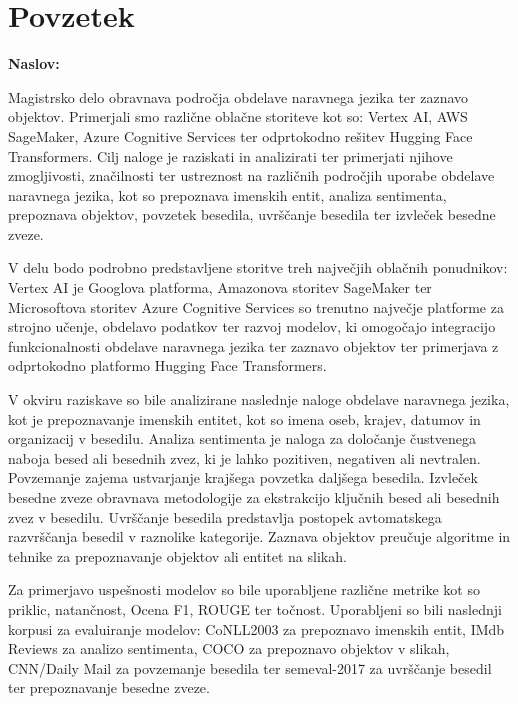\chapter*{Povzetek}

\noindent\textbf{Naslov:} \ttitle
\bigskip

Magistrsko delo obravnava področja obdelave naravnega jezika ter zaznavo objektov. Primerjali smo različne oblačne storiteve kot so: Vertex AI, AWS SageMaker, Azure Cognitive Services ter odprtokodno rešitev Hugging Face Transformers. Cilj naloge je raziskati in analizirati ter primerjati njihove zmogljivosti, značilnosti ter ustreznost na različnih področjih uporabe obdelave naravnega jezika, kot so prepoznava imenskih entit, analiza sentimenta, prepoznava objektov, povzetek  besedila, uvrščanje besedila ter izvleček besedne zveze.

V delu bodo podrobno predstavljene storitve treh največjih oblačnih ponudnikov: Vertex AI je Googlova platforma, Amazonova storitev SageMaker ter Microsoftova storitev Azure Cognitive Services so trenutno največje platforme za strojno učenje, obdelavo podatkov ter razvoj modelov, ki omogočajo integracijo funkcionalnosti obdelave naravnega jezika ter zaznavo objektov ter primerjava z odprtokodno platformo Hugging Face Transformers.

V okviru raziskave so bile analizirane naslednje naloge obdelave naravnega jezika, kot je prepoznavanje imenskih entitet, kot so imena oseb, krajev, datumov in organizacij v besedilu.
Analiza sentimenta je naloga za določanje čustvenega naboja besed ali besednih zvez, ki je lahko pozitiven, negativen ali nevtralen. Povzemanje zajema ustvarjanje krajšega povzetka daljšega besedila. Izvleček besedne zveze obravnava metodologije za ekstrakcijo ključnih besed ali besednih zvez v besedilu. 
Uvrščanje besedila predstavlja postopek avtomatskega razvrščanja besedil v raznolike kategorije. Zaznava objektov preučuje algoritme in tehnike za prepoznavanje objektov ali entitet na slikah.

Za primerjavo uspešnosti modelov so bile uporabljene različne metrike kot so priklic, natančnost, Ocena F1, ROUGE ter točnost. Uporabljeni so bili naslednji korpusi za  evaluiranje modelov: CoNLL2003 za prepoznavo imenskih entit, IMdb Reviews za analizo sentimenta, COCO za prepoznavo objektov v slikah, CNN/Daily Mail za povzemanje besedila ter semeval-2017 za uvrščanje besedil ter prepoznavanje besedne zveze.

